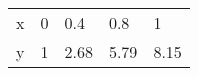 \documentclass{article}
\begin{document}
\begin{table}[h!]
\begin{tabular}{|lllll|}
\hline 
\multicolumn{1}{|p{30.865313pt}}{\raggedright x} & \multicolumn{1}{p{30.865313pt}}{\raggedright 0} & \multicolumn{1}{p{32.370937pt}}{\raggedright 0.4} & \multicolumn{1}{p{30.1125pt}}{\raggedright 0.8} & \multicolumn{1}{p{30.1125pt}|}{\raggedright 1}\\ 

\multicolumn{1}{|p{30.865313pt}}{\raggedright y} & \multicolumn{1}{p{30.865313pt}}{\raggedright 1} & \multicolumn{1}{p{32.370937pt}}{\raggedright 2.68} & \multicolumn{1}{p{30.1125pt}}{\raggedright 5.79} & \multicolumn{1}{p{30.1125pt}|}{\raggedright 8.15}\\ 
\hline 

\end{tabular}
\end{table}
\end{document}

